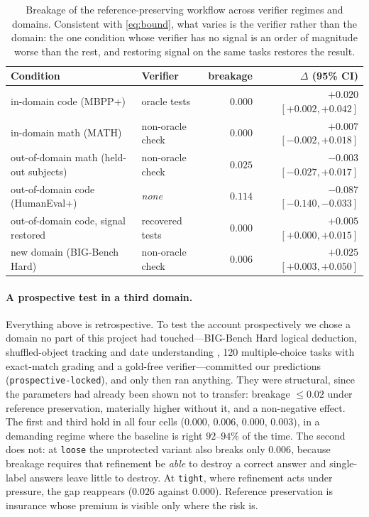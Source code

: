 \documentclass{article}
\begin{document}
\begin{table}[t]
\caption{Breakage of the reference-preserving workflow across verifier regimes
and domains. Consistent with \eqref{eq:bound}, what varies is the verifier
rather than the domain: the one condition whose verifier has no signal is an
order of magnitude worse than the rest, and restoring signal on the same tasks
restores the result.}
\label{tab:regimes}
\centering
\small
\begin{tabular}{llrr}
\toprule
Condition & Verifier & breakage & $\Delta$ (95\% CI) \\
\midrule
in-domain code (MBPP+) & oracle tests & $0.000$ & $+0.020$ $[+0.002,+0.042]$ \\
in-domain math (MATH) & non-oracle check & $0.000$ & $+0.007$ $[-0.002,+0.018]$ \\
out-of-domain math (held-out subjects) & non-oracle check & $0.025$ & $-0.003$ $[-0.027,+0.017]$ \\
out-of-domain code (HumanEval+) & \emph{none} & $0.114$ & $-0.087$ $[-0.140,-0.033]$ \\
out-of-domain code, signal restored & recovered tests & $0.000$ & $+0.005$ $[+0.000,+0.015]$ \\
new domain (BIG-Bench Hard) & non-oracle check & $0.006$ & $+0.025$ $[+0.003,+0.050]$ \\
\bottomrule
\end{tabular}
\end{table}

\paragraph{A prospective test in a third domain.} Everything above is
retrospective. To test the account prospectively we chose a domain no part of
this project had touched---BIG-Bench Hard logical deduction, shuffled-object
tracking and date understanding \citep{suzgun2023bbh}, 120 multiple-choice tasks
with exact-match grading and a gold-free verifier---committed our predictions
(\texttt{prospective-locked}), and only then ran anything. They were structural,
since the parameters had already been shown not to transfer: breakage
$\le 0.02$ under reference preservation, materially higher without it, and a
non-negative effect. The first and third hold in all four cells ($0.000$, $0.006$, $0.000$,
$0.003$), in a demanding regime where the baseline is right $92$--$94\%$ of the
time. The second does not: at \texttt{loose} the unprotected variant also breaks
only $0.006$, because breakage requires that refinement be \emph{able} to destroy
a correct answer and single-label answers leave little to destroy. At
\texttt{tight}, where refinement acts under pressure, the gap reappears ($0.026$
against $0.000$). Reference preservation is insurance whose premium is visible
only where the risk is.
\end{document}
